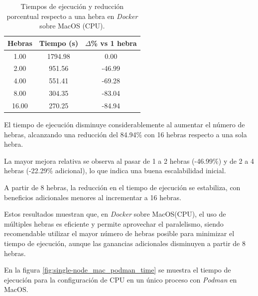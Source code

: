 \begin{table}[ht]
    \centering
    \begin{tabular}{|c|c|c|}
        \hline
        \textbf{Hebras} & \textbf{Tiempo (s)} & \textbf{$\Delta$\% vs 1 hebra} \\
        \hline
        1.00            & 1794.98             & 0.00                           \\
        2.00            & 951.56              & -46.99                         \\
        4.00            & 551.41              & -69.28                         \\
        8.00            & 304.35              & -83.04                         \\
        16.00           & 270.25              & -84.94                         \\
        \hline
    \end{tabular}
    \caption{Tiempos de ejecución y reducción porcentual respecto a una hebra en \textit{Docker} sobre MacOS (CPU).}
    \label{tab:single-node_mac_docker_time}
\end{table}

El tiempo de ejecución disminuye considerablemente al aumentar el número de hebras, alcanzando una reducción del 84.94\% con 16 hebras respecto a una sola hebra.

La mayor mejora relativa se observa al pasar de 1 a 2 hebras (-46.99\%) y de 2 a 4 hebras (-22.29\% adicional), lo que indica una buena escalabilidad inicial.

A partir de 8 hebras, la reducción en el tiempo de ejecución se estabiliza, con beneficios adicionales menores al incrementar a 16 hebras.

Estos resultados muestran que, en \textit{Docker} sobre MacOS(CPU), el uso de múltiples hebras es eficiente y permite aprovechar el paralelismo, siendo recomendable utilizar el mayor número de hebras posible para minimizar el tiempo de ejecución, aunque las ganancias adicionales disminuyen a partir de 8 hebras.

En la figura \ref{fig:single-node_mac_podman_time} se muestra el tiempo de ejecución para la configuración de CPU en un único proceso con \textit{Podman} en MacOS.

